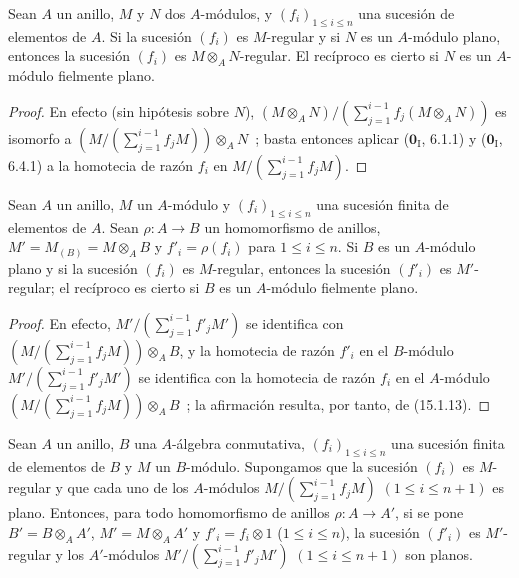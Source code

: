 \begin{proposition}[15.1.13]
\label{0.15.1.13-fr}
Sean $A$ un anillo, $M$ y $N$ dos $A$-módulos, y
$(f_i)_{1\leq i\leq n}$ una sucesión de elementos de $A$. Si la sucesión
$(f_i)$ es $M$-regular y si $N$ es un $A$-módulo plano, entonces la sucesión
$(f_i)$ es $M\otimes_A N$-regular. El recíproco es cierto si $N$ es un
$A$-módulo fielmente plano.
\end{proposition}

\begin{proof}
En efecto (sin hipótesis sobre $N$),
$(M\otimes_A N)/(\sum_{j=1}^{i-1}f_j(M\otimes_A N))$
es isomorfo a
$(M/(\sum_{j=1}^{i-1}f_jM))\otimes_A N$~;
basta entonces aplicar ($\mathbf{0}_{\mathrm I}$, 6.1.1) y
($\mathbf{0}_{\mathrm I}$, 6.4.1) a la homotecia de razón $f_i$ en
$M/(\sum_{j=1}^{i-1}f_jM)$.
\end{proof}

\begin{corollary}[15.1.14]
\label{0.15.1.14-fr}
Sean $A$ un anillo, $M$ un $A$-módulo y $(f_i)_{1\leq i\leq n}$ una sucesión
finita de elementos de $A$. Sean $\rho:A\to B$ un homomorfismo de anillos,
$M'=M_{(B)}=M\otimes_A B$ y $f'_i=\rho(f_i)$ para $1\leq i\leq n$. Si $B$ es
un $A$-módulo plano y si la sucesión $(f_i)$ es $M$-regular, entonces la
sucesión $(f'_i)$ es $M'$-regular; el recíproco es cierto si $B$ es un
$A$-módulo fielmente plano.
\end{corollary}

\begin{proof}
En efecto,
$M'/(\sum_{j=1}^{i-1}f'_jM')$
se identifica con
$(M/(\sum_{j=1}^{i-1}f_jM))\otimes_A B$,
y la homotecia de razón $f'_i$ en el $B$-módulo
$M'/(\sum_{j=1}^{i-1}f'_jM')$ se identifica con la homotecia de razón $f_i$
en el $A$-módulo
$(M/(\sum_{j=1}^{i-1}f_jM))\otimes_A B$~;
la afirmación resulta, por tanto, de (15.1.13).
\end{proof}

\begin{proposition}[15.1.15]
\label{0.15.1.15-fr}
Sean $A$ un anillo, $B$ una $A$-álgebra conmutativa,
$(f_i)_{1\leq i\leq n}$ una sucesión finita de elementos de $B$ y $M$ un
$B$-módulo. Supongamos que la sucesión $(f_i)$ es $M$-regular y que cada uno
de los $A$-módulos
$M/(\sum_{j=1}^{i-1}f_jM)$ $(1\leq i\leq n+1)$
es plano. Entonces, para todo homomorfismo de anillos $\rho:A\to A'$, si se
pone $B'=B\otimes_A A'$, $M'=M\otimes_A A'$ y $f'_i=f_i\otimes1$
\textup{($1\leq i\leq n$)}, la sucesión $(f'_i)$ es $M'$-regular y los
$A'$-módulos
$M'/(\sum_{j=1}^{i-1}f'_jM')$ $(1\leq i\leq n+1)$
son planos.
\end{proposition}

